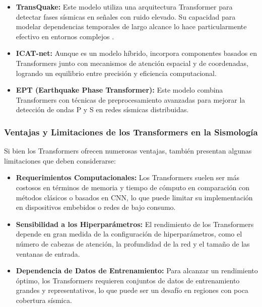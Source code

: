 \begin{itemize}
     \item \textbf{TransQuake:} Este modelo utiliza una arquitectura Transformer para detectar fases sísmicas en señales con ruido elevado. Su capacidad para modelar dependencias temporales de largo alcance lo hace particularmente efectivo en entornos complejos \cite{zhang2023ept}.

     \item \textbf{ICAT-net:} Aunque es un modelo híbrido, incorpora componentes basados en Transformers junto con mecanismos de atención espacial y de coordenadas, logrando un equilibrio entre precisión y eficiencia computacional.

     \item \textbf{EPT (Earthquake Phase Transformer):} Este modelo combina Transformers con técnicas de preprocesamiento avanzadas para mejorar la detección de ondas P y S en redes sísmicas distribuidas.

\end{itemize}

\subsubsection{Ventajas y Limitaciones de los Transformers en la Sismología}

Si bien los Transformers ofrecen numerosas ventajas, también presentan algunas limitaciones que deben considerarse:

\begin{itemize}
     \item \textbf{Requerimientos Computacionales:} Los Transformers suelen ser más costosos en términos de memoria y tiempo de cómputo en comparación con métodos clásicos o basados en CNN, lo que puede limitar su implementación en dispositivos embebidos o redes de bajo consumo.

     \item \textbf{Sensibilidad a los Hiperparámetros:} El rendimiento de los Transformers depende en gran medida de la configuración de hiperparámetros, como el número de cabezas de atención, la profundidad de la red y el tamaño de las ventanas de entrada.

     \item \textbf{Dependencia de Datos de Entrenamiento:} Para alcanzar un rendimiento óptimo, los Transformers requieren conjuntos de datos de entrenamiento grandes y representativos, lo que puede ser un desafío en regiones con poca cobertura sísmica.

\end{itemize}

